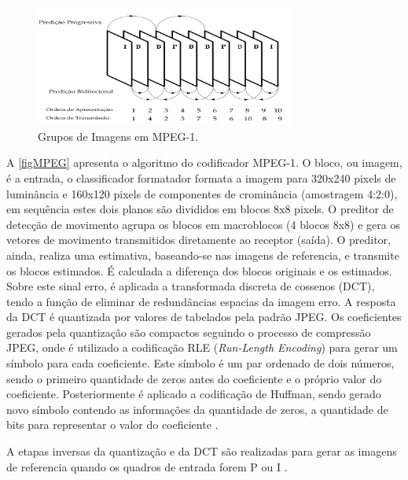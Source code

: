 \begin{figure}[htb]
	\caption{\label{figIPB} Grupos de Imagens em MPEG-1.}
	\begin{center}
		\includegraphics[height=4cm]{figIPB.png}
	\end{center}
\end{figure}

A \autoref{figMPEG} apresenta o algoritmo do codificador MPEG-1. O bloco, ou imagem, é a entrada, o classificador formatador formata a imagem para 320x240 pixels de luminância e 160x120 pixels de componentes de crominância (amostragem 4:2:0), em sequência estes dois planos são divididos em blocos 8x8 pixels. O preditor de detecção de movimento agrupa os blocos em macroblocos (4 blocos 8x8) e gera os vetores de movimento transmitidos diretamente ao receptor (saída). O preditor, ainda, realiza uma estimativa, baseando-se nas imagens de referencia, e transmite os blocos estimados. É calculada a diferença dos blocos originais e os estimados. Sobre este sinal erro, é aplicada a  transformada discreta de cossenos (DCT), tendo a função de eliminar de redundâncias espacias da imagem erro. A resposta da DCT  é quantizada  por valores de tabelados pela padrão JPEG. Os coeficientes gerados pela quantização são compactos seguindo o processo de compressão JPEG, onde é utilizado a codificação RLE (\textit{Run-Length Encoding}) para gerar
um símbolo para cada coeficiente. Este símbolo é um par
ordenado de dois números, sendo o primeiro quantidade de zeros antes do coeficiente e o próprio valor do coeficiente. Posteriormente é aplicado a codificação de Huffman, sendo gerado novo símbolo contendo as informações da quantidade de zeros, a quantidade de bits para representar o valor do coeficiente \cite{tvDigitalUSP}.


A etapas inversas da quantização e da DCT são realizadas para gerar as imagens de referencia quando os quadros de entrada forem P ou I \cite{tvDigitalUSP}.  

